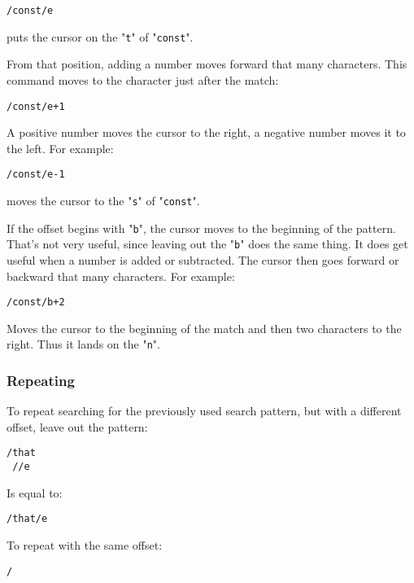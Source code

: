 \begin{Verbatim}[samepage=true]
 /const/e
\end{Verbatim}

puts the cursor on the "\texttt{t}" of "\texttt{const}".

From that position, adding a number moves forward that many characters.
This command moves to the character just after the match:

\begin{Verbatim}[samepage=true]
 /const/e+1
\end{Verbatim}

A positive number moves the cursor to the right, a negative number moves it to the left.
For example:

\begin{Verbatim}[samepage=true]
 /const/e-1
\end{Verbatim}

moves the cursor to the "\texttt{s}" of "\texttt{const}".

If the offset begins with "\texttt{b}", the cursor moves to the beginning of the pattern.
That's not very useful, since leaving out the "\texttt{b}" does the same thing.
It does get useful when a number is added or subtracted.
The cursor then goes forward or backward that many characters.
For example:

\begin{Verbatim}[samepage=true]
 /const/b+2
\end{Verbatim}

Moves the cursor to the beginning of the match and then two characters to the right.
Thus it lands on the "\texttt{n}".

\subsubsection{Repeating}
To repeat searching for the previously used search pattern, but with a different offset, leave out the pattern:

\begin{Verbatim}[samepage=true]
 /that
 //e
\end{Verbatim}

Is equal to:

\begin{Verbatim}[samepage=true]
 /that/e
\end{Verbatim}

To repeat with the same offset:

\begin{Verbatim}[samepage=true]
 /
\end{Verbatim}

